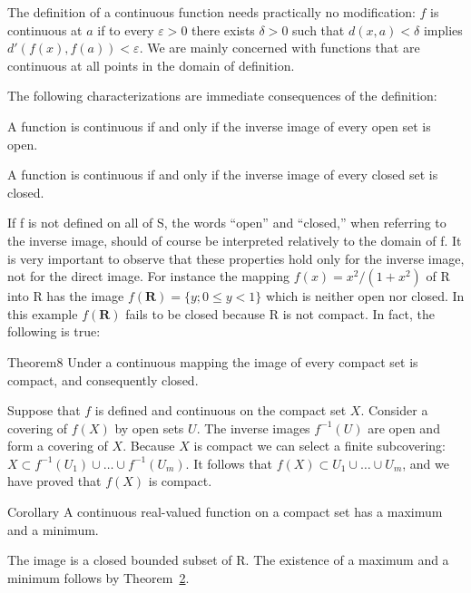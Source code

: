 The definition of a continuous function needs practically no modification: $f$ is continuous at $a$ if to every $\varepsilon > 0$ there exists $\delta > 0$ such that $d(x, a) < \delta$ implies $d'(f(x), f(a)) < \varepsilon$. We are mainly concerned with functions that are continuous at all points in the domain of definition.


The following characterizations are immediate consequences of the definition:

A function is continuous if and only if the inverse image of every open set is open.

A function is continuous if and only if the inverse image of every closed set is closed.

If f is not defined on all of S, the words “open” and “closed,” when referring to the inverse image, should of course be interpreted relatively to the domain of f. It is very important to observe that these properties hold only for the inverse image, not for the direct image. For instance the mapping $f(x) = x^{2}/(1 + x^{2})$ of R into R has the image $f(\mathbf{R}) = \{y; 0 \leq y < 1\}$ which is neither open nor closed. In this example $f(\mathbf{R})$ fails to be closed because R is not compact. In fact, the following is true:

\begin{originalstatement}{Theorem}{8}\label{thm:3.8}
Under a continuous mapping the image of every compact set is compact, and consequently closed.
\end{originalstatement}
Suppose that $f$ is defined and continuous on the compact set $X$. Consider a covering of $f(X)$ by open sets $U$. The inverse images $f^{-1}(U)$ are open and form a covering of $X$. Because $X$ is compact we can select a finite subcovering: $X \subset f^{-1}(U_1) \cup \dots \cup f^{-1}(U_m)$. It follows that $f(X) \subset U_1 \cup \dots \cup U_m$, and we have proved that $f(X)$ is compact.

\begin{originalstatement}{Corollary}{}\label{cor:3.unnumbered-p80-b6}
A continuous real-valued function on a compact set has a maximum and a minimum.
\end{originalstatement}
The image is a closed bounded subset of R. The existence of a maximum and a minimum follows by Theorem~\hyperref[thm:3.2]{2}.

